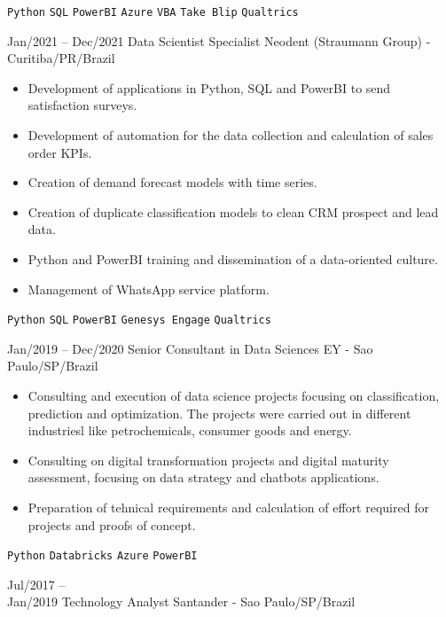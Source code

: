 \documentclass[9pt]{developercv} %
\begin{document}
\begin{entrylist}
{\begin{itemize}[noitemsep,topsep=0pt,parsep=0pt,partopsep=0pt, leftmargin=-1pt]
			\end{itemize} 
			\texttt{Python} \slashsep \texttt{SQL} \slashsep \texttt{PowerBI} \slashsep \texttt{Azure} \slashsep \texttt{VBA} \slashsep \texttt{Take Blip} \slashsep \texttt{Qualtrics}}
		\entry
		{Jan/2021 -- Dec/2021}
		{Data Scientist Specialist}
		{Neodent (Straumann Group) - Curitiba/PR/Brazil}
		{\vspace{-10pt}
			\begin{itemize}[noitemsep,topsep=0pt,parsep=0pt,partopsep=0pt, leftmargin=-1pt]
				\item Development of applications in Python, SQL and PowerBI to send satisfaction surveys.
				\item Development of automation for the data collection and calculation of sales order KPIs.
				\item Creation of demand forecast models with time series.
				\item Creation of duplicate classification models to clean CRM prospect and lead data.
				\item Python and PowerBI training and dissemination of a data-oriented culture.
				\item Management of WhatsApp service platform.
			\end{itemize} 
			\texttt{Python} \slashsep \texttt{SQL} \slashsep \texttt{PowerBI} \slashsep \texttt{Genesys Engage} \slashsep \texttt{Qualtrics}}
		\entry
		{Jan/2019 -- Dec/2020}
		{Senior Consultant in Data Sciences}
		{EY - Sao Paulo/SP/Brazil}
		{\vspace{-10pt}
			\begin{itemize}[noitemsep,topsep=0pt,parsep=0pt,partopsep=0pt, leftmargin=-1pt]
				\item Consulting and execution of data science projects focusing on classification, prediction and optimization. The projects were carried out in different industriesl like petrochemicals, consumer goods and energy.
				\item Consulting on digital transformation projects and digital maturity assessment, focusing on data strategy and chatbots applications.
				\item Preparation of tehnical requirements and calculation of effort required for projects and proofs of concept.
			\end{itemize} 
			\texttt{Python} \slashsep \texttt{Databricks} \slashsep \texttt{Azure} \slashsep \texttt{PowerBI}}
		\entry
		{Jul/2017 -- \\Jan/2019}
		{Technology Analyst}
		{Santander - Sao Paulo/SP/Brazil}

\end{entrylist}
\end{document}
